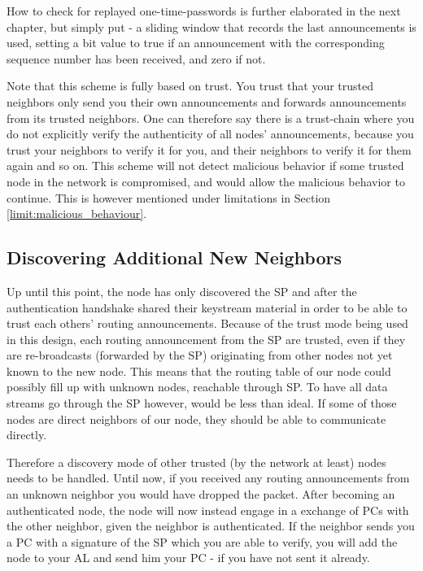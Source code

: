 How to check for replayed one-time-passwords is further elaborated in the next
chapter, but simply put - a sliding window that records the last announcements
is used, setting a bit value to true if an announcement with the corresponding
sequence number has been received, and zero if not.

Note that this scheme is fully based on trust. You trust that your trusted
neighbors only send you their own announcements and forwards announcements from
its trusted neighbors. One can therefore say there is a trust-chain where you do
not explicitly verify the authenticity of all nodes' announcements, because you
trust your neighbors to verify it for you, and their neighbors to verify it for
them again and so on. This scheme will not detect malicious behavior if some
trusted node in the network is compromised, and would allow the malicious
behavior to continue. This is however mentioned under limitations in Section
\ref{limit:malicious_behaviour}.

\subsection{Discovering Additional New Neighbors}
Up until this point, the node has only discovered the \ac{SP} and after the
authentication handshake shared their keystream material in order to be able to
trust each others' routing announcements. Because of the trust mode being used in
this design, each routing announcement from the \ac{SP} are trusted, even if they
are re-broadcasts (forwarded by the SP) originating from other nodes not yet
known to the new node. This means that the routing table of our node could
possibly fill up with unknown nodes, reachable through \ac{SP}. To have all
data streams go through the \ac{SP} however, would be less than ideal. If some
of those nodes are direct neighbors of our node, they should be able to
communicate directly.

Therefore a discovery mode of other trusted (by the network at least) nodes
needs to be handled. Until now, if you received any routing announcements
from an unknown neighbor you would have dropped the packet. After becoming an
authenticated node, the node will now instead engage in a exchange of \acp{PC}
with the other neighbor, given the neighbor is authenticated. If the neighbor
sends you a \ac{PC} with a signature of the \ac{SP} which you are able to
verify, you will add the node to your \ac{AL} and send him your \ac{PC} - if
you have not sent it already.

